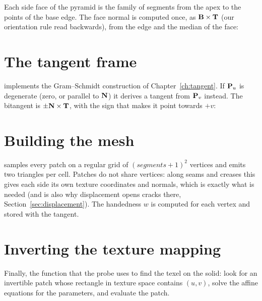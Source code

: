 
Each side face of the pyramid is the family of segments from the apex to the points of the base
edge. The face normal is computed once, as $\mathbf{B}\times\mathbf{T}$ (our orientation rule read
backwards), from the edge and the median of the face:


\section{The tangent frame}
 implements the Gram--Schmidt construction of Chapter~\ref{ch:tangent}. If
$\mathbf{P}_u$ is degenerate (zero, or parallel to $\mathbf{N}$) it derives a tangent from $\mathbf{P}_v$
instead. The bitangent is $\pm\mathbf{N}\times\mathbf{T}$, with the sign that makes it point towards $+v$:


\section{Building the mesh}
 samples every patch on a regular grid of $(\textit{segments}+1)^2$ vertices and
emits two triangles per cell. Patches do not share vertices: along seams and creases this gives
each side its own texture coordinates and normals, which is exactly what is needed (and is also
why displacement opens cracks there, Section~\ref{sec:displacement}). The handedness $w$ is
computed for each vertex and stored with the tangent.


\section{Inverting the texture mapping}
Finally, the function that the probe uses to find the texel on the solid: look for an invertible
patch whose rectangle in texture space contains $(u,v)$, solve the affine equations for the
parameters, and evaluate the patch.

